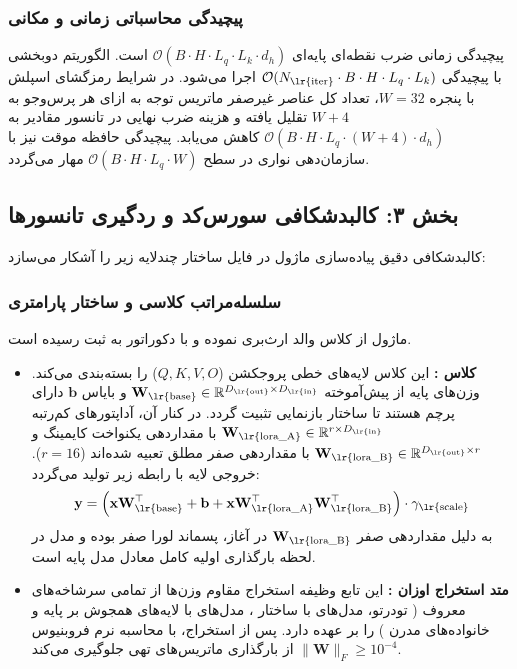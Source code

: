 \subsubsection*{پیچیدگی محاسباتی زمانی و مکانی}
پیچیدگی زمانی ضرب نقطه‌ای پایه‌ای $\mathcal{O}(B \cdot H \cdot L_q \cdot L_k \cdot d_h)$ است. الگوریتم دوبخشی با پیچیدگی $\mathcal{O}(N_{\text{\lr{iter}}} \cdot B \cdot H \cdot L_q \cdot L_k)$ اجرا می‌شود. در شرایط رمزگشای اسپلش با پنجره $W = 32$، تعداد کل عناصر غیرصفر ماتریس توجه به ازای هر پرس‌وجو به $W + 4$ تقلیل یافته و هزینه ضرب نهایی در تانسور مقادیر به $\mathcal{O}(B \cdot H \cdot L_q \cdot (W + 4) \cdot d_h)$ کاهش می‌یابد. پیچیدگی حافظه موقت نیز با سازمان‌دهی نواری در سطح $\mathcal{O}(B \cdot H \cdot L_q \cdot W)$ مهار می‌گردد.

\subsection*{بخش ۳: کالبدشکافی سورس‌کد و ردگیری تانسورها }
کالبدشکافی دقیق پیاده‌سازی ماژول در فایل  ساختار چندلایه زیر را آشکار می‌سازد:

\subsubsection*{سلسله‌مراتب کلاسی و ساختار پارامتری}
ماژول از کلاس والد  ارث‌بری نموده و با دکوراتور  به ثبت رسیده است.
\begin{itemize}
    \item \textbf{کلاس :} این کلاس لایه‌های خطی پروجکشن ($Q, K, V, O$) را بسته‌بندی می‌کند. وزن‌های پایه از پیش‌آموخته $\mathbf{W}_{\text{\lr{base}}} \in \mathbb{R}^{D_{\text{\lr{out}}} \times D_{\text{\lr{in}}}}$ و بایاس $\mathbf{b}$ دارای پرچم  هستند تا ساختار بازنمایی تثبیت گردد. در کنار آن، آداپتورهای کم‌رتبه $\mathbf{W}_{\text{\lr{lora\_A}}} \in \mathbb{R}^{r \times D_{\text{\lr{in}}}}$ با مقداردهی یکنواخت کایمینگ و $\mathbf{W}_{\text{\lr{lora\_B}}} \in \mathbb{R}^{D_{\text{\lr{out}}} \times r}$ با مقداردهی صفر مطلق تعبیه شده‌اند ($r=16$). خروجی لایه با رابطه زیر تولید می‌گردد:
    \begin{equation}
    \mathbf{y} = \left(\mathbf{x} \mathbf{W}_{\text{\lr{base}}}^\top + \mathbf{b} + \mathbf{x} \mathbf{W}_{\text{\lr{lora\_A}}}^\top \mathbf{W}_{\text{\lr{lora\_B}}}^\top \right) \cdot \gamma_{\text{\lr{scale}}}
    \end{equation}
    به دلیل مقداردهی صفر $\mathbf{W}_{\text{\lr{lora\_B}}}$ در آغاز، پسماند لورا صفر بوده و مدل در لحظه بارگذاری اولیه کامل معادل مدل پایه است.
    \item \textbf{متد استخراج اوزان :} این تابع وظیفه استخراج مقاوم وزن‌ها از تمامی سرشاخه‌های معروف ( تودرتو، مدل‌های  با ساختار ، مدل‌های  با لایه‌های همجوش  بر پایه  و خانواده‌های مدرن ) را بر عهده دارد. پس از استخراج، با محاسبه نرم فروبنیوس $\|\mathbf{W}\|_F \ge 10^{-4}$ از بارگذاری ماتریس‌های تهی جلوگیری می‌کند.
\end{itemize}

